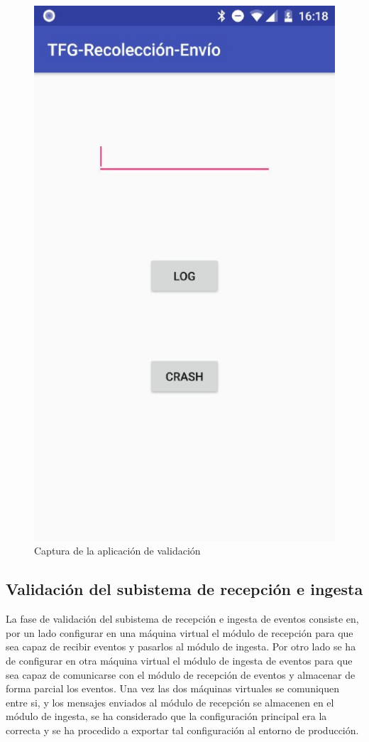 \begin{figure}[!htb]
	\centering
	\includegraphics[scale=0.40] {captura.jpeg}
	\caption{Captura de la aplicación de validación}
	\label{fig:android}
\end{figure}

\subsection{Validación del subistema de recepción e ingesta}
La fase de validación del subistema de recepción e ingesta de eventos consiste en, por un lado configurar en una máquina virtual el módulo de recepción para que sea capaz de recibir eventos y pasarlos al módulo de ingesta. Por otro lado se ha de configurar en otra máquina virtual el módulo de ingesta de eventos para que sea capaz de comunicarse con el módulo de recepción de eventos y almacenar de forma parcial los eventos. Una vez las dos máquinas virtuales se comuniquen entre si, y los mensajes enviados al módulo de recepción se almacenen en el módulo de ingesta, se ha considerado que la configuración principal era la correcta y se ha procedido a exportar tal configuración al entorno de producción.

